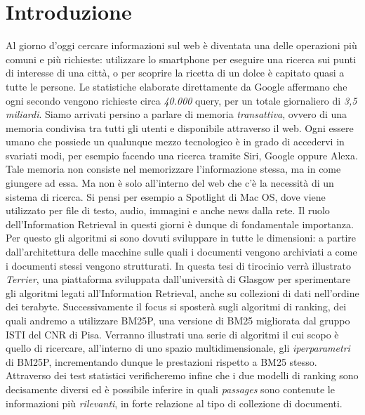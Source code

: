 \chapter{Introduzione}
Al giorno d'oggi cercare informazioni sul web è diventata una delle operazioni più comuni e più richieste:
utilizzare lo smartphone per eseguire una ricerca sui punti di interesse di una città, o per scoprire la ricetta di un dolce è capitato quasi a tutte le persone.
Le statistiche elaborate direttamente da Google affermano che ogni secondo vengono richieste circa \textit{40.000} query, per un totale
giornaliero di \textit{3,5 miliardi}.
Siamo arrivati persino a parlare di memoria \textit{transattiva}, ovvero di una memoria condivisa tra tutti gli utenti e disponibile attraverso il web.
Ogni essere umano che possiede un qualunque mezzo tecnologico è in grado di accedervi in svariati modi, per esempio facendo una ricerca tramite Siri, Google oppure Alexa.
Tale memoria non consiste nel memorizzare l'informazione stessa, ma in come giungere ad essa.
Ma non è solo all'interno del web che c'è la necessità di un sistema di ricerca. Si pensi per esempio a Spotlight di Mac OS, dove
viene utilizzato  per file di testo, audio, immagini e anche news dalla rete.
Il ruolo dell'Information Retrieval in questi giorni è dunque di fondamentale importanza.
Per questo gli algoritmi si sono dovuti sviluppare in tutte le dimensioni: a partire dall'architettura delle macchine sulle quali i documenti vengono archiviati a come i documenti stessi vengono strutturati. In questa tesi di tirocinio verrà illustrato \textit{Terrier}, una piattaforma sviluppata dall'università di Glasgow
per sperimentare gli algoritmi legati all'Information Retrieval, anche su collezioni di dati nell'ordine dei terabyte.  Successivamente il focus si sposterà
sugli algoritmi di ranking, dei quali andremo a utilizzare BM25P, una versione di BM25 migliorata dal gruppo ISTI del CNR di Pisa.
Verranno illustrati una serie di algoritmi il cui scopo è quello di ricercare, all'interno di uno spazio multidimensionale,
gli \textit{iperparametri} di BM25P, incrementando dunque le prestazioni rispetto a BM25 stesso.
Attraverso dei test statistici verificheremo infine che i due modelli di ranking sono decisamente diversi ed è possibile
inferire in quali \textit{passages} sono contenute le informazioni più \textit{rilevanti}, in forte relazione al tipo di collezione di documenti.

